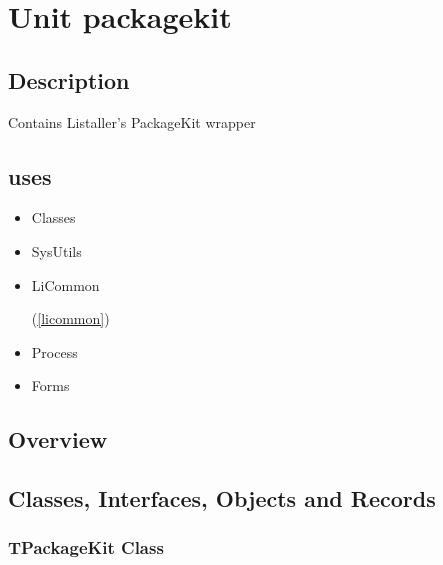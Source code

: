 \documentclass{report}
\newif\ifpdf
\begin{document}
\chapter{Unit packagekit}
\label{packagekit}
\section{Description}
Contains Listaller's PackageKit wrapper
\section{uses}
\begin{itemize}
\item \begin{ttfamily}Classes\end{ttfamily}\item \begin{ttfamily}SysUtils\end{ttfamily}\item \begin{ttfamily}LiCommon\end{ttfamily}(\ref{licommon})\item \begin{ttfamily}Process\end{ttfamily}\item \begin{ttfamily}Forms\end{ttfamily}\end{itemize}
\section{Overview}
\begin{description}
\item[\texttt{\begin{ttfamily}TPackageKit\end{ttfamily} Class}]
\end{description}
\section{Classes, Interfaces, Objects and Records}
\ifpdf
\subsection*{\large{\textbf{TPackageKit Class}}\normalsize\hspace{1ex}\hrulefill}
\else
\subsection*{TPackageKit Class}
\fi
\label{packagekit.TPackageKit}
\end{document}

